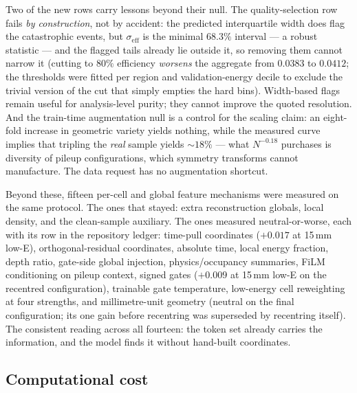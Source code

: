\documentclass[11pt,a4paper]{article}
\newcommand{\seff}{\ensuremath{\sigma_{\mathrm{eff}}}}
\begin{document}
Two of the new rows carry lessons beyond their null. The quality-selection
row fails \emph{by construction}, not by accident: the predicted
interquartile width does flag the catastrophic events, but \seff{} is the
minimal $68.3\%$ interval --- a robust statistic --- and the flagged tails
already lie outside it, so removing them cannot narrow it (cutting to
$80\%$ efficiency \emph{worsens} the aggregate from $0.0383$ to $0.0412$;
the thresholds were fitted per region and validation-energy decile to
exclude the trivial version of the cut that simply empties the hard bins).
Width-based flags remain useful for analysis-level purity; they cannot improve the
quoted resolution. And the train-time augmentation null is a control for
the scaling claim: an eight-fold increase in geometric variety yields
nothing, while the measured curve implies that tripling the \emph{real}
sample yields $\sim$$18\%$ --- what $N^{-0.18}$ purchases is diversity of pileup
configurations, which symmetry transforms cannot manufacture. The data
request has no augmentation shortcut.

Beyond these, fifteen per-cell and global feature mechanisms were measured
on the same protocol. The ones that stayed: extra reconstruction globals,
local density, and the clean-sample auxiliary. The ones measured
neutral-or-worse, each with its row in the repository ledger: time-pull
coordinates ($+0.017$ at 15\,mm low-E), orthogonal-residual coordinates,
absolute time, local energy fraction, depth ratio, gate-side global
injection, physics/occupancy summaries, FiLM conditioning on pileup
context, signed gates ($+0.009$ at 15\,mm low-E on the recentred
configuration), trainable gate temperature, low-energy cell reweighting at
four strengths, and millimetre-unit geometry (neutral on the final
configuration; its one gain before recentring was superseded by recentring
itself). The consistent reading across all fourteen: the token set already
carries the information, and the model finds it without hand-built
coordinates.

\subsection{Computational cost}
\label{sec:cost}
\end{document}
